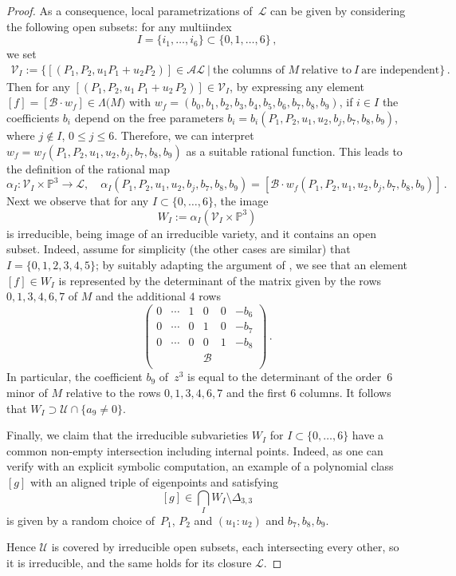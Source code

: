 \documentclass[a4paper, 11pt, reqno]{amsart}
\theoremstyle{plain}
\theoremstyle{definition}
\newcommand{\p}{\mathbb{P}}
\newcommand{\sL}{\mathcal{L}}
\newcommand{\sU}{\mathcal{U}}
\newcommand{\sV}{\mathcal{V}}
\begin{document}
\begin{proof}
As a consequence, local parametrizations of~$\sL$ can be given by considering the following open subsets:
for any multiindex
%
\[
  I = \{i_1, \dots, i_6\} \subset \{0, 1, \dots, 6\} \,,
\]
%
we set
%
\begin{multline*}
  \sV_I :=
  \bigl\{
    [(P_1, P_2, u_1 P_1 +u_2P_2)] \in \mathcal{AL} \ | \ \text{the\ columns\ of\ } M \ 
    \text{relative \ to} \ I\ \text{are\ independent}
  \bigr\} \,.
\end{multline*}
%
Then for any $[(P_1, P_2, u_1 \, P_1 + u_2 \, P_2)] \in \sV_I$, by expressing any element
$[f] =[\mathcal{B} \cdot w_f]\in \Lambda \bigl( M \bigr)$ with
$ w_f = (b_0,
  b_1,
  b_2,
  b_3,
  b_4,
  b_5, b_6,b_7,b_8,b_9)$,
%
if $i\in I$ the coefficients $b_i$ depend on the free parameters $b_i=b_i(P_1,P_2,u_1,u_2,b_j,b_7,b_8,b_9)$, where $j \not \in I$, $0\le j \le 6$. Therefore, we can interpret $w_f=w_f(P_1,P_2,u_1,u_2,b_j,b_7,b_8,b_9)$ as a suitable rational function.
This leads to the definition of the rational map
%
\[
  \alpha_I \colon \sV_I \times \p^3 \to \sL, \quad
  \alpha_I (P_1,P_2,u_1,u_2,b_j,b_7,b_8,b_9)=
  [\mathcal{B} \cdot w_f(P_1,P_2,u_1,u_2,b_j,b_7,b_8,b_9)] \,.
\]
%
Next we observe that for any $I \subset \{0,\dots, 6\}$, the image
%
\[
  W_I := \alpha_I (\sV_I \times \p^3)
\]
%
is irreducible, being image of an irreducible variety, and it
contains an open subset. Indeed, assume for simplicity (the other cases are similar) that
$I=\{0,1,2,3,4,5\}$; by suitably adapting the argument of \Cref{lemma:construct_cubic}, we see that an element $[f]\in W_I$ is represented by the determinant of the
matrix given by the rows
$0,1,3,4,6,7$ of $M$ and the additional $4$ rows
%
\[
  \left(
  \begin{array}{cccccc}
    0 & \cdots & 1&0&0&-b_6 \\
    0 & \cdots & 0&1&0&-b_7 \\
    0 & \cdots & 0&0&1&-b_8 \\
    & & & \mathcal{B} & & \\
  \end{array}
  \right) \,.
\]
%
In particular, the coefficient $b_9$ of~$z^3$ is equal to the determinant of the order~$6$ minor of $M$ relative to the rows $0,1,3,4,6,7$ and the first $6$ columns. It follows that $W_I \supset \sU \cap \{ a_9 \neq 0\}$. 

Finally, we claim that the irreducible subvarieties $W_I$ for $I\subset \{0,\dots, 6\}$ have a common non-empty intersection
including internal points. Indeed, as one can verify with an explicit symbolic computation, an example of a polynomial
class~$[g]$ with an aligned triple of eigenpoints and satisfying
%
\[
  [g] \in \bigcap_I W_I \setminus \Delta_{3,3}
\]
%
is given by a random choice of~$P_1$, $P_2$ and $(u_1:u_2)$ and $b_7,b_8,b_9$.

Hence $\sU$ is covered by irreducible open subsets, each intersecting every other, so it is irreducible, and the same holds for its closure $\sL$.
\end{proof}
\end{document}
